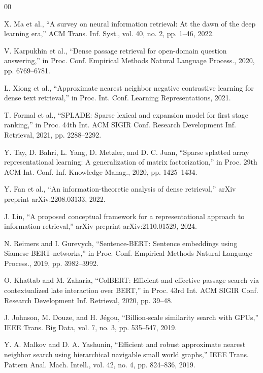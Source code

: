 \documentclass[conference,anonymous]{IEEEtran}
\begin{document}
\begin{thebibliography}{00}

 X. Ma et al., ``A survey on neural information retrieval: At the dawn of the deep learning era,'' ACM Trans. Inf. Syst., vol. 40, no. 2, pp. 1--46, 2022.

 V. Karpukhin et al., ``Dense passage retrieval for open-domain question answering,'' in Proc. Conf. Empirical Methods Natural Language Process., 2020, pp. 6769--6781.

 L. Xiong et al., ``Approximate nearest neighbor negative contrastive learning for dense text retrieval,'' in Proc. Int. Conf. Learning Representations, 2021.

 T. Formal et al., ``SPLADE: Sparse lexical and expansion model for first stage ranking,'' in Proc. 44th Int. ACM SIGIR Conf. Research Development Inf. Retrieval, 2021, pp. 2288--2292.

 Y. Tay, D. Bahri, L. Yang, D. Metzler, and D. C. Juan, ``Sparse splatted array representational learning: A generalization of matrix factorization,'' in Proc. 29th ACM Int. Conf. Inf. Knowledge Manag., 2020, pp. 1425--1434.

 Y. Fan et al., ``An information-theoretic analysis of dense retrieval,'' arXiv preprint arXiv:2208.03133, 2022.

 J. Lin, ``A proposed conceptual framework for a representational approach to information retrieval,'' arXiv preprint arXiv:2110.01529, 2024.

 N. Reimers and I. Gurevych, ``Sentence-BERT: Sentence embeddings using Siamese BERT-networks,'' in Proc. Conf. Empirical Methods Natural Language Process., 2019, pp. 3982--3992.

 O. Khattab and M. Zaharia, ``ColBERT: Efficient and effective passage search via contextualized late interaction over BERT,'' in Proc. 43rd Int. ACM SIGIR Conf. Research Development Inf. Retrieval, 2020, pp. 39--48.

 J. Johnson, M. Douze, and H. Jégou, ``Billion-scale similarity search with GPUs,'' IEEE Trans. Big Data, vol. 7, no. 3, pp. 535--547, 2019.

 Y. A. Malkov and D. A. Yashunin, ``Efficient and robust approximate nearest neighbor search using hierarchical navigable small world graphs,'' IEEE Trans. Pattern Anal. Mach. Intell., vol. 42, no. 4, pp. 824--836, 2019.


\end{thebibliography}
\end{document}
